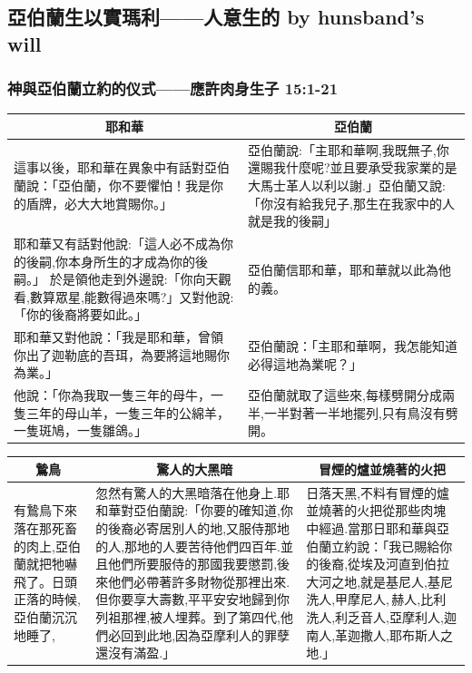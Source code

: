 \subsection{亞伯蘭生以實瑪利——人意生的 by hunsband's will}
\subsubsection{神與亞伯蘭立約的仪式——應許肉身生子 15:1-21}
\label{sec:YaBoLanYuGodLiYue}

\begin{table}[H]
\centering
\begin{tabular}{p{9.25cm}|p{8.5cm}}\hline\hline
\multicolumn{1}{c|}{耶和華}&\multicolumn{1}{c}{亞伯蘭}\\\hline
這事以後，耶和華在異象中有話對亞伯蘭說：「亞伯蘭，你不要懼怕！我是你的盾牌，必大大地賞賜你。」 
&亞伯蘭說:「主耶和華啊,我既無子,你還賜我什麼呢?並且要承受我家業的是大馬士革人以利以謝.」亞伯蘭又說:「你沒有給我兒子,那生在我家中的人就是我的後嗣」 \\\hline
耶和華又有話對他說:「這人必不成為你的後嗣,你本身所生的才成為你的後嗣。」 於是領他走到外邊說:「你向天觀看,數算眾星,能數得過來嗎?」又對他說:「你的後裔將要如此。」
&亞伯蘭信耶和華，耶和華就以此為他的義。 \\\hline
耶和華又對他說：「我是耶和華，曾領你出了迦勒底的吾珥，為要將這地賜你為業。」&亞伯蘭說：「主耶和華啊，我怎能知道必得這地為業呢？」 \\\hline
他說：「你為我取一隻三年的母牛，一隻三年的母山羊，一隻三年的公綿羊，一隻斑鳩，一隻雛鴿。」&亞伯蘭就取了這些來,每樣劈開分成兩半,一半對著一半地擺列,只有鳥沒有劈開。\\\hline
\end{tabular}
\end{table}


\begin{table}[H]
\centering
\begin{tabular}{p{2.5cm}|p{8cm}|p{6.50cm}}\hline\hline
\multicolumn{1}{c|}{鷙鳥}&\multicolumn{1}{c|}{驚人的大黑暗}&\multicolumn{1}{c}{冒煙的爐並燒著的火把}\\\hline
有鷙鳥下來落在那死畜的肉上,亞伯蘭就把牠嚇飛了。日頭正落的時候,亞伯蘭沉沉地睡了,
&忽然有驚人的大黑暗落在他身上.耶和華對亞伯蘭說:「你要的確知道,你的後裔必寄居別人的地,又服侍那地的人,那地的人要苦待他們四百年.並且他們所要服侍的那國我要懲罰,後來他們必帶著許多財物從那裡出來.但你要享大壽數,平平安安地歸到你列祖那裡,被人埋葬。到了第四代,他們必回到此地,因為亞摩利人的罪孽還沒有滿盈.」
&日落天黑,不料有冒煙的爐並燒著的火把從那些肉塊中經過.當那日耶和華與亞伯蘭立約說：「我已賜給你的後裔,從埃及河直到伯拉大河之地,就是基尼人,基尼洗人,甲摩尼人, 赫人,比利洗人,利乏音人,亞摩利人,迦南人,革迦撒人,耶布斯人之地.」\\\hline
\end{tabular}
\end{table}




